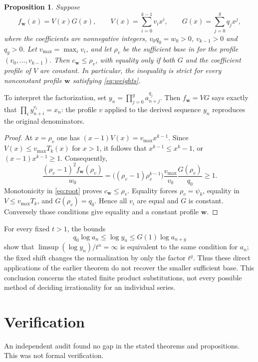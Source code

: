 \documentclass[11pt]{article}
\newtheorem{proposition}[theorem]{Proposition}
\numberwithin{equation}{section}
\newcommand{\bw}{\mathbf w}
\begin{document}
\begin{proposition}\label{prop:products}
Suppose
\[
  f_{\bw}(x)=V(x)G(x),\qquad
  V(x)=\sum_{i=0}^{k-1}v_ix^i,\qquad G(x)=\sum_{j=0}^g q_jx^j,
\]
where the coefficients are nonnegative integers,
$v_0q_0=w_0>0$, $v_{k-1}>0$ and $q_g>0$.
Let $v_{\max}=\max_i v_i$, and let $\rho_v$ be the sufficient base in
\cite[Theorem~3]{BKKKZ} for the profile $(v_0,\ldots,v_{k-1})$.
Then $c_{\bw}\le\rho_v$, with equality only if both $G$ and the
coefficient profile of $V$ are constant. In particular, the inequality
is strict for every nonconstant profile $\bw$ satisfying
\eqref{eq:weights}.
\end{proposition}

To interpret the factorization, set $y_n=\prod_{j=0}^g a_{n+j}^{q_j}$.
Then $f_{\bw}=VG$ says exactly that $\prod_i y_{n+i}^{v_i}=x_n$:
the profile $v$ applied to the derived sequence $y_n$ reproduces the
original denominators.

\begin{proof}
At $x=\rho_v$ one has $(x-1)V(x)=v_{\max}x^{k-1}$.
Since $V(x)\le v_{\max}T_k(x)$ for $x>1$, it follows that
$x^{k-1}\le x^k-1$, or $(x-1)x^{k-1}\ge1$.
Consequently,
\begin{equation}\label{eq:productcomparison}
  \frac{(\rho_v-1)^2 f_{\bw}(\rho_v)}{w_0}
   =\bigl((\rho_v-1)\rho_v^{k-1}\bigr)
       \frac{v_{\max}}{v_0}\frac{G(\rho_v)}{q_0}\ge1.
\end{equation}
Monotonicity in \eqref{eq:root} proves $c_{\bw}\le\rho_v$.
Equality forces $\rho_v=\psi_k$, equality in $V\le v_{\max}T_k$,
and $G(\rho_v)=q_0$. Hence all $v_i$ are equal and $G$ is constant.
Conversely those conditions give equality and a constant profile $\bw$.
\end{proof}

For every fixed $t>1$, the bounds
\[
  q_0\log a_n\le\log y_n\le G(1)\log a_{n+g}
\]
show that $\limsup(\log y_n)/t^n=\infty$ is equivalent to the same
condition for $a_n$; the fixed shift changes the normalization by only
the factor $t^g$. Thus these direct applications of the earlier theorem
do not recover the smaller sufficient base. This conclusion concerns
the stated finite product substitutions, not every possible method of
deciding irrationality for an individual series.

\section*{Verification}
An independent audit found no gap in the stated theorems and propositions.
This was not formal verification.
\end{document}
